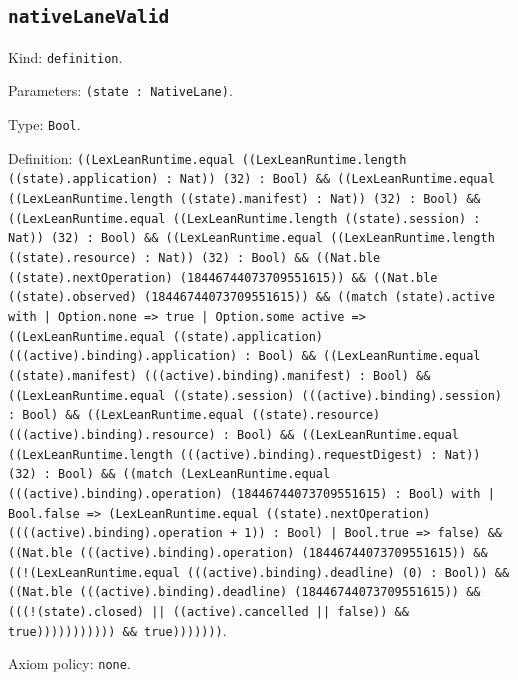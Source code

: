 \documentclass[11pt]{article}
\begin{document}
\subsection*{\texttt{nativeLaneValid}}
\noindent Kind: \texttt{definition}.\par
\noindent Parameters: \texttt{(state : NativeLane)}.\par
\noindent Type: \texttt{Bool}.\par
\noindent Definition: \texttt{((LexLeanRuntime.equal ((LexLeanRuntime.length ((state).application) : Nat)) (32) : Bool) \&\& ((LexLeanRuntime.equal ((LexLeanRuntime.length ((state).manifest) : Nat)) (32) : Bool) \&\& ((LexLeanRuntime.equal ((LexLeanRuntime.length ((state).session) : Nat)) (32) : Bool) \&\& ((LexLeanRuntime.equal ((LexLeanRuntime.length ((state).resource) : Nat)) (32) : Bool) \&\& ((Nat.ble ((state).nextOperation) (18446744073709551615)) \&\& ((Nat.ble ((state).observed) (18446744073709551615)) \&\& ((match (state).active with | Option.none => true | Option.some active => ((LexLeanRuntime.equal ((state).application) (((active).binding).application) : Bool) \&\& ((LexLeanRuntime.equal ((state).manifest) (((active).binding).manifest) : Bool) \&\& ((LexLeanRuntime.equal ((state).session) (((active).binding).session) : Bool) \&\& ((LexLeanRuntime.equal ((state).resource) (((active).binding).resource) : Bool) \&\& ((LexLeanRuntime.equal ((LexLeanRuntime.length (((active).binding).requestDigest) : Nat)) (32) : Bool) \&\& ((match (LexLeanRuntime.equal (((active).binding).operation) (18446744073709551615) : Bool) with | Bool.false => (LexLeanRuntime.equal ((state).nextOperation) ((((active).binding).operation + 1)) : Bool) | Bool.true => false) \&\& ((Nat.ble (((active).binding).operation) (18446744073709551615)) \&\& ((!(LexLeanRuntime.equal (((active).binding).deadline) (0) : Bool)) \&\& ((Nat.ble (((active).binding).deadline) (18446744073709551615)) \&\& (((!(state).closed) || ((active).cancelled || false)) \&\& true))))))))))) \&\& true)))))))}.\par
\noindent Axiom policy: \texttt{none}.\par
\end{document}
